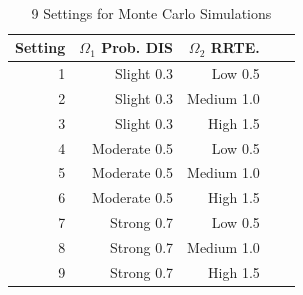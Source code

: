 \begin{table}[!htbp]
\caption {9 Settings for Monte Carlo Simulations}
\centering
{\tt
\begin{tabular}{rrrrr}
\hline
Setting &  $\Omega_1$ Prob. DIS & $\Omega_2$  RRTE. \\
\hline
1 & Slight\hspace{1mm} 0.3& Low\hspace{1mm} 0.5 \\ 
2 & Slight\hspace{1mm} 0.3& Medium\hspace{1mm} 1.0 \\ 
3 & Slight\hspace{1mm} 0.3& High\hspace{1mm} 1.5 \\ 
4 & Moderate\hspace{1mm} 0.5& Low\hspace{1mm} 0.5 \\ 
5 & Moderate\hspace{1mm} 0.5& Medium\hspace{1mm} 1.0 \\ 
6 & Moderate\hspace{1mm} 0.5& High\hspace{1mm} 1.5 \\ 
7 & Strong\hspace{1mm} 0.7& Low\hspace{1mm} 0.5 \\ 
8 & Strong\hspace{1mm} 0.7& Medium\hspace{1mm} 1.0 \\ 
9 & Strong\hspace{1mm} 0.7& High\hspace{1mm} 1.5 \\ 
\hline
\end{tabular}}
\end{table}

